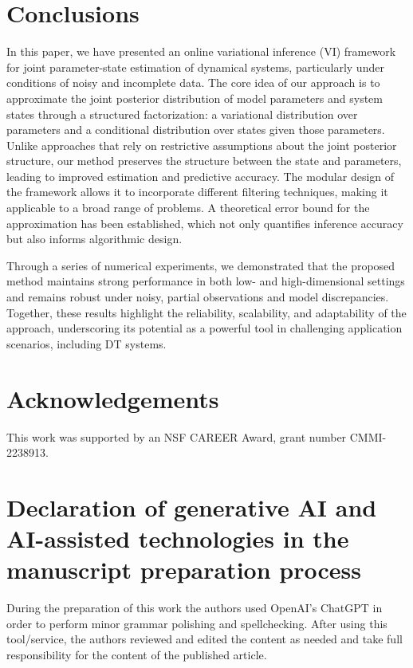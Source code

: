 \documentclass[preprint,3p,times]{elsarticle}
\begin{document}
\section{Conclusions}
\label{sec:conclusion}
In this paper, we have presented an online variational inference (VI) framework for joint parameter-state estimation of dynamical systems, particularly under conditions of noisy and incomplete data. The core idea of our approach is to approximate the joint posterior distribution of model parameters and system states through a structured factorization: a variational distribution over parameters and a conditional distribution over states given those parameters. Unlike approaches that rely on restrictive assumptions about the joint posterior structure, our method preserves the structure between the state and parameters, leading to improved estimation and predictive accuracy. The modular design of the framework allows it to incorporate different filtering techniques, making it applicable to a broad range of problems. A theoretical error bound for the approximation has been established, which not only quantifies inference accuracy but also informs algorithmic design.

Through a series of numerical experiments, we demonstrated that the proposed method maintains strong performance in both low- and high-dimensional settings and remains robust under noisy, partial observations and model discrepancies. Together, these results highlight the reliability, scalability, and adaptability of the approach, underscoring its potential as a powerful tool in challenging application scenarios, including DT systems.

\section*{Acknowledgements}
This work was supported by an NSF CAREER Award, grant number CMMI-2238913.


\section*{Declaration of generative AI and AI-assisted technologies in the manuscript preparation process}

During the preparation of this work the authors used OpenAI’s ChatGPT in order to perform minor grammar polishing and spellchecking. After using this tool/service, the authors reviewed and edited the content as needed and take full responsibility for the content of the published article.
\end{document}
